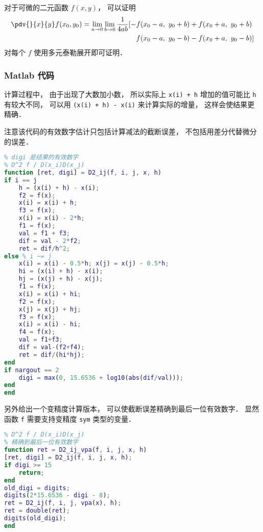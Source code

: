 
\begin{issues}
\issueDraft
\end{issues}


对于可微的二元函数 $f(x,y)$， 可以证明
\begin{equation}
\begin{aligned}
\pdv{}{x}{y} f(x_0,y_0) = \lim_{a\to 0}\lim_{b\to 0}\frac{1}{4ab}[-& f(x_0-a,\ y_0+b) + f(x_0+a,\  y_0+b)\\
& f(x_0-a,\  y_0-b) - f(x_0+a,\  y_0-b)]
\end{aligned}
\end{equation}
对每个 $f$ 使用多元泰勒展开即可证明．

\subsubsection{Matlab 代码}

计算过程中， 由于出现了大数加小数， 所以实际上 \verb|x(i) + h| 增加的值可能比 \verb|h| 有较大不同， 可以用 \verb|(x(i) + h) - x(i)| 来计算实际的增量， 这样会使结果更精确．

注意该代码的有效数字估计只包括计算减法的截断误差， 不包括用差分代替微分的误差．
\begin{lstlisting}[language=matlab, caption=D2\_ij.m]
% 数值二阶偏导
% digi 是结果的有效数字
% D^2 f / D(x_i)D(x_j)
function [ret, digi] = D2_ij(f, i, j, x, h)
if i == j
    h = (x(i) + h) - x(i);
    f2 = f(x);
    x(i) = x(i) + h;
    f3 = f(x);
    x(i) = x(i) - 2*h;
    f1 = f(x);
    val = f1 + f3;
    dif = val - 2*f2;
    ret = dif/h^2;
else % i ~= j
    x(i) = x(i) - 0.5*h; x(j) = x(j) - 0.5*h;
    hi = (x(i) + h) - x(i);
    hj = (x(j) + h) - x(j);
    f1 = f(x);
    x(i) = x(i) + hi;
    f2 = f(x);
    x(j) = x(j) + hj;
    f3 = f(x);
    x(i) = x(i) - hi;
    f4 = f(x);
    val = f1+f3;
    dif = val-(f2+f4);
    ret = dif/(hi*hj);
end
if nargout == 2
    digi = max(0, 15.6536 + log10(abs(dif/val)));
end
end
\end{lstlisting}

另外给出一个变精度计算版本， 可以使截断误差精确到最后一位有效数字． 显然函数 \verb|f| 需要支持变精度 \verb|sym| 类型的变量．
\begin{lstlisting}[language=matlab, caption=D2\_ij\_vpa.m]
% 数值二阶偏导 (变精度)
% D^2 f / D(x_i)D(x_j)
% 精确到最后一位有效数字
function ret = D2_ij_vpa(f, i, j, x, h)
[ret, digi] = D2_ij(f, i, j, x, h);
if digi >= 15
    return;
end
old_digi = digits;
digits(2*15.6536 - digi - 8);
ret = D2_ij(f, i, j, vpa(x), h);
ret = double(ret);
digits(old_digi);
end
\end{lstlisting}
